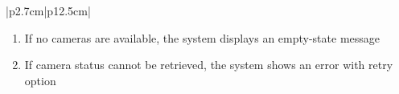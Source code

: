 \begin{table}[H]
\begin{tabular}{|p{2.7cm}|p{12.5cm}|}
\begin{minipage}[t]{\linewidth}
\begin{enumerate}[topsep=0pt,itemsep=1pt,parsep=0pt,partopsep=0pt]
                                              \item If no cameras are available, the system displays an empty-state message
                                              \item If camera status cannot be retrieved, the system shows an error with retry
                                                    option
                                          \end{enumerate}
                                      \end{minipage} \\
            \hline
        \end{tabular}
        \label{tab:eng-list-cameras}
    \end{table}
